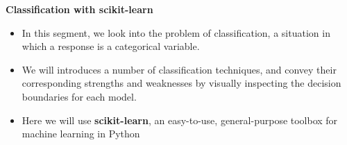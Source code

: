 \documentclass[MASTER.tex]{subfiles}
\begin{document}
 
\begin{frame}
\textbf{Classification with scikit-learn}
\begin{itemize}
\item In this segment, we
 look into the problem of classification, a situation in which a response is a categorical variable. 
\item We will introduces a number of classification techniques, and 
convey their corresponding strengths and weaknesses by visually inspecting the decision boundaries for each model.
\item Here we will use \textbf{scikit-learn}, an easy-to-use, general-purpose toolbox for machine learning in Python
	\end{itemize}

\end{frame}
\end{document}
